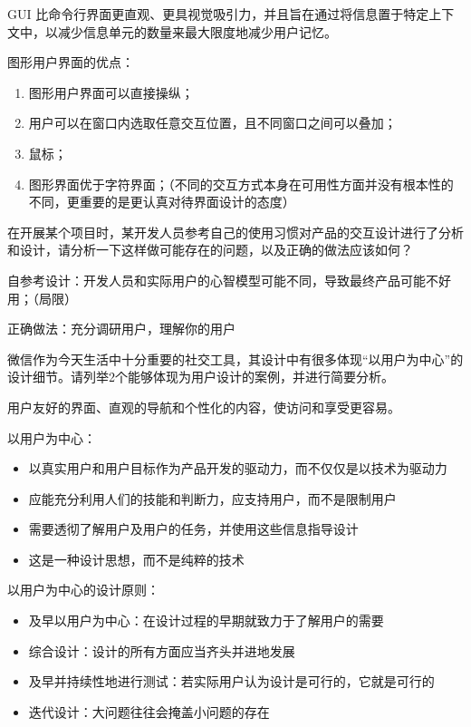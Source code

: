 \begin{solution}
GUI 比命令行界面更直观、更具视觉吸引力，并且旨在通过将信息置于特定上下文中，以减少信息单元的数量来最大限度地减少用户记忆。

图形用户界面的优点：
\begin{enumerate}[label=\arabic*.]
    \item 图形用户界面可以直接操纵；
    \item 用户可以在窗口内选取任意交互位置，且不同窗口之间可以叠加；
    \item 鼠标；
    \item 图形界面优于字符界面；（不同的交互方式本身在可用性方面并没有根本性的不同，更重要的是更认真对待界面设计的态度）
\end{enumerate}
\end{solution}



\begin{problem}[2022]
在开展某个项目时，某开发人员参考自己的使用习惯对产品的交互设计进行了分析和设计，请分析一下这样做可能存在的问题，以及正确的做法应该如何？
\end{problem}

\begin{solution}
自参考设计：开发人员和实际用户的心智模型可能不同，导致最终产品可能不好用；（局限）

正确做法：充分调研用户，理解你的用户
\end{solution}



\begin{problem}[2022]
微信作为今天生活中十分重要的社交工具，其设计中有很多体现“以用户为中心”的设计细节。请列举2个能够体现为用户设计的案例，并进行简要分析。
\end{problem}

\begin{solution}
用户友好的界面、直观的导航和个性化的内容，使访问和享受更容易。

以用户为中心：
\begin{itemize}
    \item 以真实用户和用户目标作为产品开发的驱动力，而不仅仅是以技术为驱动力
    \item 应能充分利用人们的技能和判断力，应支持用户，而不是限制用户
    \item 需要透彻了解用户及用户的任务，并使用这些信息指导设计
    \item 这是一种设计思想，而不是纯粹的技术
\end{itemize}

以用户为中心的设计原则：
\begin{itemize}
    \item 及早以用户为中心：在设计过程的早期就致力于了解用户的需要
    \item 综合设计：设计的所有方面应当齐头并进地发展
    \item 及早并持续性地进行测试：若实际用户认为设计是可行的，它就是可行的
    \item 迭代设计：大问题往往会掩盖小问题的存在
\end{itemize}
\end{solution}





